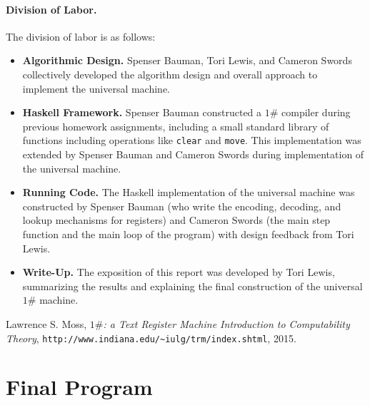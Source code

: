 \documentclass[10pt, preprint, nocopyrightspace]{sigplanconf}
\newcommand{\oh}{$1\#$\xspace}
\begin{document}
\paragraph{Division of Labor.} The division of labor is as follows:
\begin{itemize}
\item \textbf{Algorithmic Design.}
      Spenser Bauman, Tori Lewis, and Cameron Swords collectively developed the
      algorithm design and overall approach to implement the universal machine.
\item \textbf{Haskell Framework.}
      Spenser Bauman constructed a \oh compiler during previous homework
      assignments, including a small standard library of functions including
      operations like \lstinline{clear} and \lstinline{move}. This
      implementation was extended by Spenser Bauman and Cameron Swords during
      implementation of the universal machine.
\item \textbf{Running Code.}
      The Haskell implementation of the universal machine was constructed by
      Spenser Bauman (who write the encoding, decoding, and lookup mechanisms
      for registers) and Cameron Swords (the main step function and the main
      loop of the program) with design feedback from Tori Lewis.
\item \textbf{Write-Up.}
      The exposition of this report was developed by Tori Lewis, summarizing the
      results and explaining the final construction of the universal \oh
      machine.
\end{itemize}

\begin{thebibliography}{99}

  Lawrence S. Moss,
  \emph{\oh: a Text Register Machine Introduction to Computability Theory},
  \lstinline{http://www.indiana.edu/~iulg/trm/index.shtml},
  2015.

\end{thebibliography}

\clearpage

\appendix


\clearpage

\twocolumn[]

\clearpage

\twocolumn[]

\clearpage

\section{Final Program}


\end{document}
